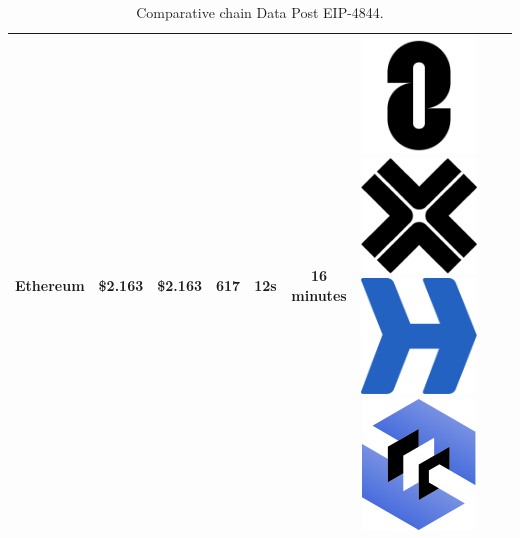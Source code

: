 \documentclass[fleqn,10pt]{olplainarticle}
\begin{document}
\begin{table}[H]
\begin{tabular}{|c|c|c|c|c|c|c|c|c|}
		
		Ethereum & \cellcolor[RGB]{255,0,0}\$2.163 & \cellcolor[RGB]{255,0,0}\$2.163 & \cellcolor[RGB]{150,255,100}617 & \cellcolor[RGB]{255,0,0}12s  & \cellcolor[RGB]{255,50,0}16 minutes \cite{bnb_chain_coming_nodate} & \includegraphics[width=0.03\linewidth]{img/logoLayerZero} \includegraphics[width=0.03\linewidth]{img/logoAxelar}  \includegraphics[width=0.03\linewidth]{img/logoHyperlane} \includegraphics[width=0.03\linewidth]{img/logoCCIP} & & \\ \hline
		
	\end{tabular}
	\caption{Comparative chain Data Post EIP-4844.}
	\label{tab:TableChainDank}
\end{table}




\newpage

\end{document}

